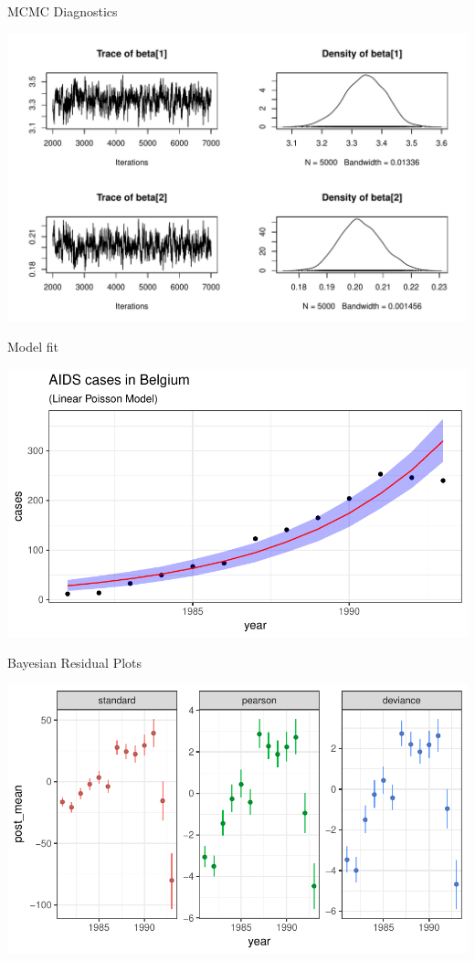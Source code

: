 \documentclass[11pt,ignorenonframetext,]{beamer}
\begin{document}
\begin{frame}{MCMC Diagnostics}

\includegraphics{Lec3_files/figure-beamer/unnamed-chunk-23-1.pdf}

\end{frame}

\begin{frame}{Model fit}

\includegraphics{Lec3_files/figure-beamer/unnamed-chunk-24-1.pdf}

\end{frame}

\begin{frame}{Bayesian Residual Plots}

\includegraphics[width=\textwidth]{Lec3_files/figure-beamer/unnamed-chunk-25-1}

\end{frame}
\end{document}
